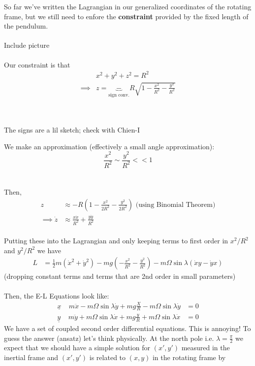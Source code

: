\documentclass[11pt]{article}
\begin{document}
So far we've written the Lagrangian in our generalized coordinates of the rotating frame, but we still need to enfore the \textbf{constraint} provided by the fixed length of the pendulum.
\\
\\
Include picture
\\
\\
Our constraint is that 
\begin{align*}
  &x^2 + y^2 + z^2 = R^2 \\
  \implies& z = \underbrace{-}_{\text{sign conv.}} R \sqrt{1 - \frac{x^2}{R^2} - \frac{y^2}{R^2}}
\end{align*}
\\
\\
\begin{note}
  {The signs are a lil sketch; check with Chien-I}\\
\end{note}
We make an approximation (effectively a small angle approximation):
\[ \frac{x^2}{R^2} \sim \frac{y^2}{R^2} << 1 \] 
\\
\\
Then,
\begin{align*}
  z &\approx -R \left(1 - \frac{x^2}{2R^2} - \frac{y^2}{2R^2 }\right) \text{  (using Binomial Theorem)} \\
  \implies \dot{z} &\approx \frac{x \dot{x}}{R^2} + \frac{y\dot{y}}{R^2}
\end{align*}
\\
Putting these into the Lagrangian and only keeping terms to first order in $x^2/R^2$ and $y^2/R^2$ we have 
\\
\begin{align*}
  L &= \frac{1}{2}m\left(\dot{x}^2 + \dot{y}^2\right) - mg \left(-\frac{x^2}{R^2}-\frac{y^2}{R^2}\right) - m\Omega\sin\lambda \left(\dot{x}y - \dot{y}x\right)
\end{align*}
(dropping constant terms and terms that are 2nd order in small parameters)
\\
\\
Then, the E-L Equations look like:
\begin{align*}
  \underline{x}\;\;\;\;m\ddot{x} -m\Omega\sin\lambda\dot{y} + mg \frac{X}{R} - m\Omega\sin\lambda\dot{y} &= 0 \\
  \underline{y}\;\;\;\;m\ddot{y} + m\Omega\sin\lambda \dot{x} + mg \frac{y}{R} + m\Omega\sin\lambda \dot{x} &= 0
\end{align*}
We have a set of coupled second order differential equations. This is annoying! To guess the answer (ansatz) let's think physically. At the north pole i.e. $\lambda = \frac{\pi}{2}$ we expect that we should have a simple solution for $(x', y')$ measured in the inertial frame and $(x', y')$ is related to $(x,y)$ in the rotating frame by 
\end{document}
